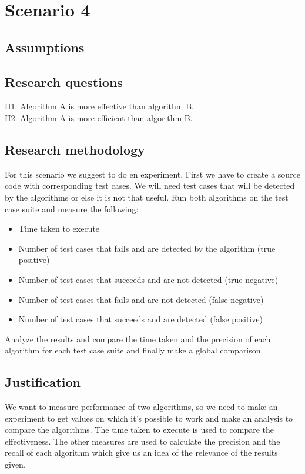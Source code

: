 \documentclass{article}
\begin{document}
\section{Scenario 4}
\subsection{Assumptions}

\subsection{Research questions}
H1: Algorithm A is more effective than algorithm B. \\
H2: Algorithm A is more efficient than algorithm B.

\subsection{Research methodology}
For this scenario we suggest to do en experiment. First we have to create a source code with corresponding test cases. We will need test cases that will be detected by the algorithms or else it is not that useful. Run both algorithms on the test case suite and measure the following:
\begin{itemize}
    \item Time taken to execute
    \item Number of test cases that fails and are detected by the algorithm (true positive)
    \item Number of test cases that succeeds and are not detected (true negative)
    \item Number of test cases that fails and are not detected (false negative)
    \item Number of test cases that succeeds and are detected (false positive)
\end{itemize}
Analyze the results and compare the time taken and the precision of each algorithm for each test case suite and finally make a global comparison.

\subsection{Justification}
We want to measure performance of two algorithms, so we need to make an experiment to get values on which it’s possible to work and make an analysis to compare the algorithms.
The time taken to execute is used to compare the effectiveness.
The other measures are used to calculate the precision and the recall of each algorithm which give us an idea of the relevance of the results given.
\end{document}
